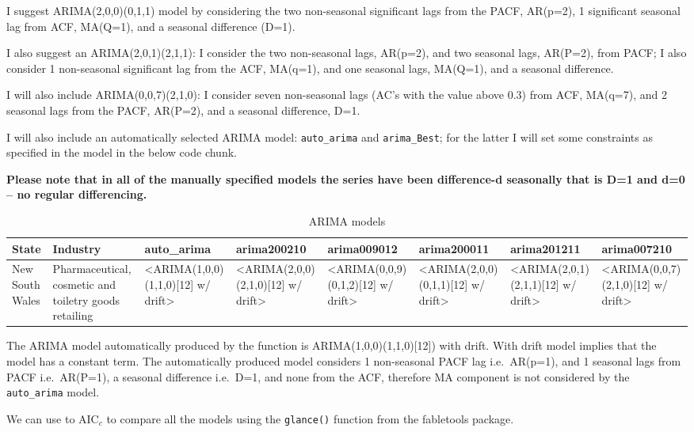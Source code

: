 \documentclass[
]{article}
\begin{document}
I suggest ARIMA(2,0,0)(0,1,1) model by considering the two non-seasonal
significant lags from the PACF, AR(p=2), 1 significant seasonal lag from
ACF, MA(Q=1), and a seasonal difference (D=1).

I also suggest an ARIMA(2,0,1)(2,1,1): I consider the two non-seasonal
lags, AR(p=2), and two seasonal lags, AR(P=2), from PACF; I also
consider 1 non-seasonal significant lag from the ACF, MA(q=1), and one
seasonal lags, MA(Q=1), and a seasonal difference.

I will also include ARIMA(0,0,7)(2,1,0): I consider seven non-seasonal
lags (AC's with the value above 0.3) from ACF, MA(q=7), and 2 seasonal
lags from the PACF, AR(P=2), and a seasonal difference, D=1.

I will also include an automatically selected ARIMA model:
\texttt{auto\_arima} and \texttt{arima\_Best}; for the latter I will set
some constraints as specified in the model in the below code chunk.

\textbf{Please note that in all of the manually specified models the
series have been difference-d seasonally that is D=1 and d=0 -- no
regular differencing.}

\begin{table}

\caption{\label{tab:unnamed-chunk-18}ARIMA models}
\centering
\begin{tabular}[t]{l|l|l|l|l|l|l|l}
\hline
State & Industry & auto\_arima & arima200210 & arima009012 & arima200011 & arima201211 & arima007210\\
\hline
New South Wales & Pharmaceutical, cosmetic and toiletry goods retailing & <ARIMA(1,0,0)(1,1,0)[12] w/ drift> & <ARIMA(2,0,0)(2,1,0)[12] w/ drift> & <ARIMA(0,0,9)(0,1,2)[12] w/ drift> & <ARIMA(2,0,0)(0,1,1)[12] w/ drift> & <ARIMA(2,0,1)(2,1,1)[12] w/ drift> & <ARIMA(0,0,7)(2,1,0)[12] w/ drift>\\
\hline
\end{tabular}
\end{table}

The ARIMA model automatically produced by the function is
ARIMA(1,0,0)(1,1,0){[}12{]}) with drift. With drift model implies that
the model has a constant term. The automatically produced model
considers 1 non-seasonal PACF lag i.e.~AR(p=1), and 1 seasonal lags from
PACF i.e.~AR(P=1), a seasonal difference i.e.~D=1, and none from the
ACF, therefore MA component is not considered by the
\texttt{auto\_arima} model.

We can use to AIC\(_c\) to compare all the models using the
\texttt{glance()} function from the fabletools package.
\end{document}
